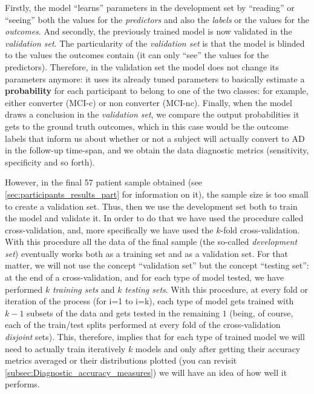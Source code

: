 \documentclass[a4paper,12pt]{elsarticle}  %
\begin{document}
Firstly, the model ``learns'' parameters in the development set by ``reading'' or ``seeing'' both the values for the \textit{predictors} and also the \textit{labels} or the values for the \textit{outcomes}. And secondly, the previously trained model is now validated in the \textit{validation set}. The particularity of the \textit{validation set} is that the model is blinded to the values the outcomes contain (it can only ``see'' the values for the predictors). Therefore, in the validation set the model does not change its parameters anymore: it uses its already tuned parameters to
basically estimate a \textbf{probability} for each participant to belong to one of the two classes: for example, either converter (MCI-c) or non converter (MCI-nc). Finally, when the model draws a conclusion in the \textit{validation set}, we compare the output probabilities it gets to the ground truth outcomes, which in this case would be the outcome labels that inform us about whether or not a subject will actually convert to AD in the follow-up time-span, and we obtain the data diagnostic metrics (sensitivity, specificity and so forth).


However, in the final 57 patient sample obtained (see \ref{sec:participants_results_part} for information on it), the sample size is too small to create a validation set. Thus, then we use the development set both to train the model and validate it. In order to do that we have used the procedure called cross-validation, and, more specifically we have used the $k$-fold cross-validation. With this procedure all the data of the final sample (the so-called \textit{development set}) eventually works both as a training set and as a validation set. For that matter, we will not use the concept ``validation set'' but the concept ``testing set'': at the end of a cross-validation, and for each type of model tested, we have performed $k$ \textit{training sets} and $k$ \textit{testing sets}. With this procedure, at every fold or iteration of the process (for i=1 to i=k), each type of model gets trained with $k-1$ subsets of the data and gets tested in the remaining $1$ (being, of course, each of the train/test splits performed at every fold of the cross-validation \textit{disjoint} sets). This, therefore, implies that for each type of trained model we will need to actually train iteratively $k$ models and only after getting their accuracy metrics averaged or their distributions plotted (you can revisit \ref{subsec:Diagnostic_accuracy_measures}) we will have an idea of how well it performs.
\end{document}
